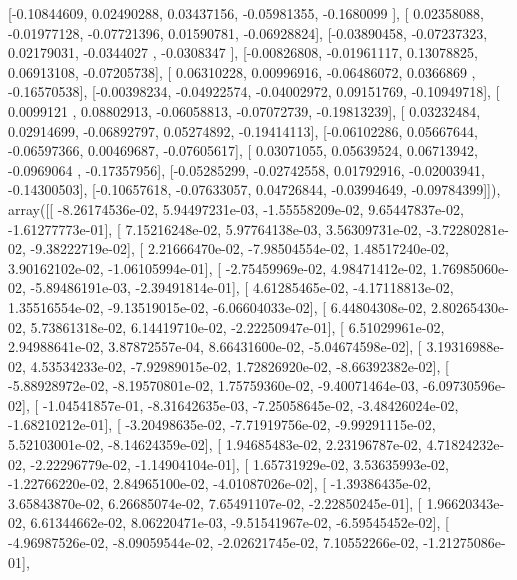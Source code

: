 \documentclass{article}
\begin{document}
       [-0.10844609,  0.02490288,  0.03437156, -0.05981355, -0.1680099 ],
       [ 0.02358088, -0.01977128, -0.07721396,  0.01590781, -0.06928824],
       [-0.03890458, -0.07237323,  0.02179031, -0.0344027 , -0.0308347 ],
       [-0.00826808, -0.01961117,  0.13078825,  0.06913108, -0.07205738],
       [ 0.06310228,  0.00996916, -0.06486072,  0.0366869 , -0.16570538],
       [-0.00398234, -0.04922574, -0.04002972,  0.09151769, -0.10949718],
       [ 0.0099121 ,  0.08802913, -0.06058813, -0.07072739, -0.19813239],
       [ 0.03232484,  0.02914699, -0.06892797,  0.05274892, -0.19414113],
       [-0.06102286,  0.05667644, -0.06597366,  0.00469687, -0.07605617],
       [ 0.03071055,  0.05639524,  0.06713942, -0.0969064 , -0.17357956],
       [-0.05285299, -0.02742558,  0.01792916, -0.02003941, -0.14300503],
       [-0.10657618, -0.07633057,  0.04726844, -0.03994649, -0.09784399]]), array([[ -8.26174536e-02,   5.94497231e-03,  -1.55558209e-02,
          9.65447837e-02,  -1.61277773e-01],
       [  7.15216248e-02,   5.97764138e-03,   3.56309731e-02,
         -3.72280281e-02,  -9.38222719e-02],
       [  2.21666470e-02,  -7.98504554e-02,   1.48517240e-02,
          3.90162102e-02,  -1.06105994e-01],
       [ -2.75459969e-02,   4.98471412e-02,   1.76985060e-02,
         -5.89486191e-03,  -2.39491814e-01],
       [  4.61285465e-02,  -4.17118813e-02,   1.35516554e-02,
         -9.13519015e-02,  -6.06604033e-02],
       [  6.44804308e-02,   2.80265430e-02,   5.73861318e-02,
          6.14419710e-02,  -2.22250947e-01],
       [  6.51029961e-02,   2.94988641e-02,   3.87872557e-04,
          8.66431600e-02,  -5.04674598e-02],
       [  3.19316988e-02,   4.53534233e-02,  -7.92989015e-02,
          1.72826920e-02,  -8.66392382e-02],
       [ -5.88928972e-02,  -8.19570801e-02,   1.75759360e-02,
         -9.40071464e-03,  -6.09730596e-02],
       [ -1.04541857e-01,  -8.31642635e-03,  -7.25058645e-02,
         -3.48426024e-02,  -1.68210212e-01],
       [ -3.20498635e-02,  -7.71919756e-02,  -9.99291115e-02,
          5.52103001e-02,  -8.14624359e-02],
       [  1.94685483e-02,   2.23196787e-02,   4.71824232e-02,
         -2.22296779e-02,  -1.14904104e-01],
       [  1.65731929e-02,   3.53635993e-02,  -1.22766220e-02,
          2.84965100e-02,  -4.01087026e-02],
       [ -1.39386435e-02,   3.65843870e-02,   6.26685074e-02,
          7.65491107e-02,  -2.22850245e-01],
       [  1.96620343e-02,   6.61344662e-02,   8.06220471e-03,
         -9.51541967e-02,  -6.59545452e-02],
       [ -4.96987526e-02,  -8.09059544e-02,  -2.02621745e-02,
          7.10552266e-02,  -1.21275086e-01],
\end{document}
